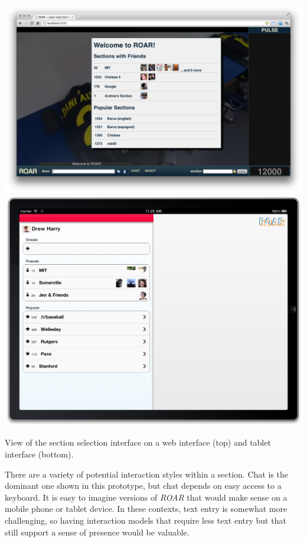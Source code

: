 \begin{marginfigure}
	\includegraphics{figures/roar/roar_sections.png}
	\includegraphics{figures/roar/roar_sections_tablet.png}
	\caption{View of the section selection interface on a web interface (top) and tablet interface (bottom).}
	\label{fig:roar_section_browser}
\end{marginfigure}

There are a variety of potential interaction styles within a section. Chat is the dominant one shown in this prototype, but chat depends on easy access to a keyboard. It is easy to imagine versions of \emph{ROAR} that would make sense on a mobile phone or tablet device. In these contexts, text entry is somewhat more challenging, so having interaction models that require less text entry but that still support a sense of presence would be valuable.

